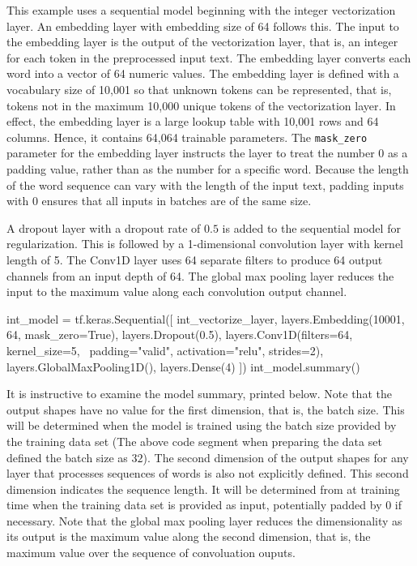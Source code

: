 This example uses a sequential model beginning with the integer vectorization layer. An embedding layer with embedding size of 64 follows this. The input to the embedding layer is the output of the vectorization layer, that is, an integer for each token in the preprocessed input text. The embedding layer converts each word into a vector of 64 numeric values. The embedding layer is defined with a vocabulary size of 10,001 so that unknown tokens can be represented, that is, tokens not in the maximum 10,000 unique tokens of the vectorization layer. In effect, the embedding layer is a large lookup table with 10,001 rows and 64 columns. Hence, it contains 64,064 trainable parameters. The \texttt{mask\_zero} parameter for the embedding layer instructs the layer to treat the number $0$ as a padding value, rather than as the number for a specific word. Because the length of the word sequence can vary with the length of the input text, padding inputs with $0$ ensures that all inputs in batches are of the same size.

A dropout layer with a dropout rate of $0.5$ is added to the sequential model for regularization. This is followed by a 1-dimensional convolution layer with kernel length of 5. The Conv1D layer uses 64 separate filters to produce 64 output channels from an input depth of 64. The global max pooling layer reduces the input to the maximum value along each convolution output channel.

\begin{samepage}
\begin{pythoncode}
int_model = tf.keras.Sequential([
  int_vectorize_layer, 
  layers.Embedding(10001, 64, mask_zero=True),
  layers.Dropout(0.5),
  layers.Conv1D(filters=64, kernel_size=5, \
      padding="valid", activation="relu", strides=2),
  layers.GlobalMaxPooling1D(),
  layers.Dense(4)
  ])
int_model.summary()
\end{pythoncode}
\end{samepage}

It is instructive to examine the model summary, printed below. Note that the output shapes have no value for the first dimension, that is, the batch size. This will be determined when the model is trained using the batch size provided by the training data set (The above code segment when preparing the data set defined the batch size as $32$). The second dimension of the output shapes for any layer that processes sequences of words is also not explicitly defined. This second dimension indicates the sequence length. It will be determined from at training time when the training data set is provided as input, potentially padded by $0$ if necessary. Note that the global max pooling layer reduces the dimensionality as its output is the maximum value along the second dimension, that is, the maximum value over the sequence of convoluation ouputs. 

